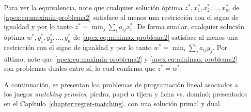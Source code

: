 Para ver la equivalencia, note que cualquier solución óptima $z^*, x_1^*, x_2^*, ..., x_m^*$ de \ref{apex:eq:maximin-problema2} satisface al menos una restricción con el signo de igualdad y por lo tanto $z^* = \min_j \sum_i a_{ij}x_i^*$. De forma similar, cualquier solución óptima $w^*, y_1^*, y_2^*, ..., y_n^*$ de \ref{apex:eq:minimax-problema2} satisface al menos una restricción con el signo de igualdad y por lo tanto $w^* = \min_i \sum_j a_{ij}y_j$. Por último, note que \ref{apex:eq:maximin-problema2} y \ref{apex:eq:minimax-problema2} son problemas duales entre sí, lo cual confirma que $z^* = w^*$.

A continuación, se presentan loa problemas de programación lineal asociados a los juegos \textit{matching pennies}, piedra, papel o tijera y ficha vs. dominó; presentados en el Capítulo~\ref{chapter:regret-matching}, con una solución primal y dual.

